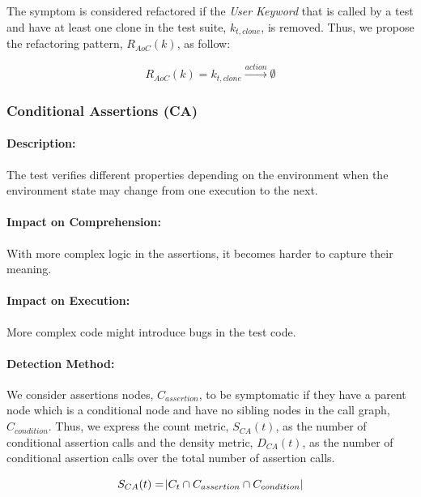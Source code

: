 The symptom is considered refactored if the \emph{User Keyword} that is called by a test  and have at least one clone in the test suite, $k_{t, clone}$, is removed. Thus, we propose the refactoring pattern, $R_{AoC}(k)$, as follow:

\begin{equation*}
    R_{AoC}(k) = k_{t, clone} \xrightarrow{action} \emptyset
\end{equation*}

\subsubsection{Conditional Assertions (CA)}

\paragraph{Description:}

The test verifies different properties depending on the environment when the environment state may change from one execution to the next.
\paragraph{Impact on Comprehension:} 

With more complex logic in the assertions, it becomes harder to capture their meaning.

\paragraph{Impact on Execution:} 

More complex code might introduce bugs in the test code.

\paragraph{Detection Method:}

We consider assertions nodes, $C_{assertion}$, to be symptomatic if they have a parent node which is a conditional node and have no sibling nodes in the call graph, $C_{condition}$. Thus, we express the count metric, $S_{CA}(t)$, as the number of conditional assertion calls and the density metric, $D_{CA}(t)$, as the number of conditional assertion calls over the total number of assertion calls.

\begin{equation*}
    S_{CA}(t) = \abs{C_{t} \cap C_{assertion} \cap C_{condition}}
\end{equation*}

